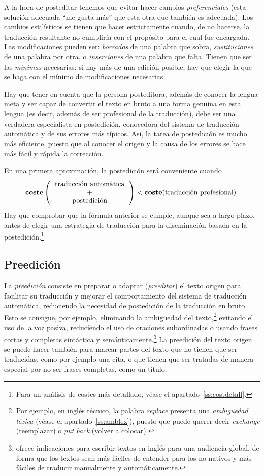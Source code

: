A la hora de posteditar tenemos que evitar hacer cambios \emph{preferenciales} (esta solución adecuada ``me gusta más'' que esta otra que también es adecuada). Los cambios estilísticos se tienen que hacer estrictamente cuando, de no hacerse, la traducción resultante no cumpliría con el propósito para el cual fue encargada. Las modificaciones pueden ser: \emph{borrados} de una palabra que sobra, \emph{sustituciones} de una palabra por otra, o \emph{inserciones} de una palabra que falta. Tienen que ser las \emph{mínimas} necesarias: si hay más de una edición posible, hay que elegir la que se haga con el mínimo de modificaciones necesarias. 

Hay que tener en cuenta que la persona posteditora, además de conocer la lengua meta y ser capaz de convertir el texto en bruto a una forma genuina en esta lengua (es decir, además de ser profesional de la traducción), debe ser una verdadera especialista en postedición, conocedora del sistema de traducción automática y de sus errores más típicos. Así, la tarea de postedición es mucho más eficiente, puesto que al conocer el origen y la causa de los errores se hace más fácil y rápida la corrección. 

En una primera aproximación, la postedición será conveniente cuando $$\textbf{coste}\left(\mbox{\begin{tabular}{c}traducción automática\\ +\\ postedición\end{tabular}}\right) < \textbf{coste}(\mbox{traducción profesional}). $$ \label{pg:cost} Hay que comprobar que la fórmula anterior se cumple, aunque sea a largo plazo, antes de elegir una estrategia de traducción para la diseminación basada en la postedición.\footnote{Para un análisis de costes más detallado, véase el apartado~\ref{ss:costdetall}.} 

\subsection{Preedición} \label{ss:preedicio} La \emph{preedición} consiste en preparar o adaptar (\emph{preeditar}) el texto origen para facilitar su traducción y mejorar el comportamiento del sistema de traducción automática, reduciendo la necesidad de postedición de la traducción en bruto. Esto se consigue, por ejemplo, eliminando la ambigüedad del texto,\footnote{Por ejemplo, en inglés técnico, la palabra \emph{replace} presenta una \emph{ambigüedad léxica} (véase el apartado~\ref{ss:amblex}), puesto que puede querer decir \emph{exchange} (reemplazar) o \emph{put back} (volver a colocar).} evitando el uso de la voz pasiva, reduciendo el uso de oraciones subordinadas o usando frases cortas y completas sintáctica y semánticamente.\footnote{\citet{kohl08} ofrece indicaciones para escribir textos en inglés para una audiencia global, de forma que los textos sean más fáciles de entender para los no nativos y más fáciles de traducir manualmente y automáticamente.} La preedición del texto origen se puede hacer también para marcar partes del texto que no tienen que ser traducidas, como por ejemplo una cita, o que tienen que ser tratadas de manera especial por no ser frases completas, como un título. 

